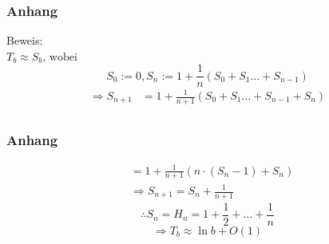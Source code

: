 \documentclass[•]{beamer}
\begin{document}
\begin{frame}
\frametitle{Anhang}
	Beweis:\\
	$ T_b \approx S_b \text{, wobei }$ $$S_0 := 0, S_n := 1 + \frac{1}{n} (S_0 + S_1 \dots + S_{n-1})$$
	\begin{align*}
	\Rightarrow S_{n+1} &= 1 + \frac{1}{n+1}(S_0 + S_1 \dots + S_{n-1}+ S_n)\\
	\end{align*}
	
\end{frame}

\begin{frame}
\frametitle{Anhang}
\begin{align*}
&= 1 + \frac{1}{n+1}(n\cdot (S_n - 1) + S_n)\\
	&\Rightarrow S_{n+1}= S_n + \frac{1}{n+1}
\end{align*}
$$\therefore S_n = H_n = 1 + \frac{1}{2} + \dots +\frac{1}{n}$$ $$ \Rightarrow T_b \approx \ln b + O(1)$$

\end{frame}
\end{document}
